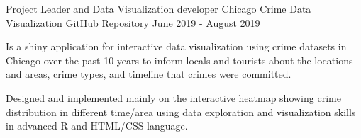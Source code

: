 \begin{cventries}
   \cventry
    {Project Leader and Data Visualization developer} %
    {Chicago Crime Data Visualization} %
     {\href{https://github.com/nussarafirn/info-201-final-project}{GitHub Repository}} %
    {June 2019 - August 2019} %
    {
      \begin{cvitems} %
        \item {
          Is a shiny application for interactive data visualization using crime datasets in Chicago over the past 10 years to inform locals and tourists about the locations and areas, crime types, and timeline that crimes were committed.
        }
        \item {
            Designed and implemented mainly on the interactive heatmap showing crime distribution in different time/area using data exploration and visualization skills in advanced R and HTML/CSS language. }
      \end{cvitems}
    }
\end{cventries}
